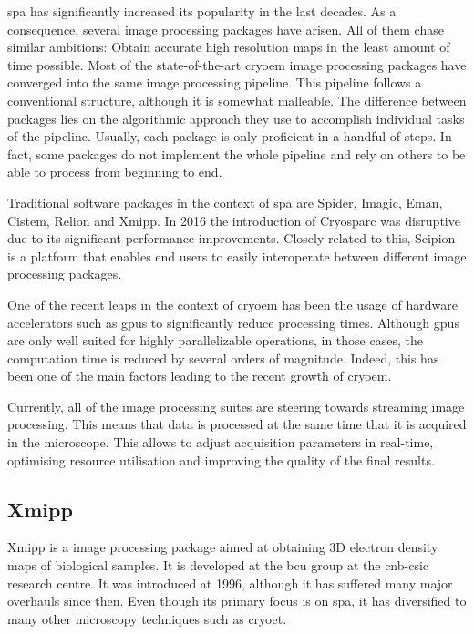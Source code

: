 \documentclass[../main.tex]{subfiles}
\begin{document}
\Gls{spa} has significantly increased its popularity in the last decades. As a consequence, several image processing packages have arisen. All of them chase similar ambitions: Obtain accurate high resolution maps in the least amount of time possible. Most of the state-of-the-art \gls{cryoem} image processing packages have converged into the same image processing pipeline. This pipeline follows a conventional structure, although it is somewhat malleable. The difference between packages lies on the algorithmic approach they use to accomplish individual tasks of the pipeline. Usually, each package is only proficient in a handful of steps. In fact, some packages do not implement the whole pipeline and rely on others to be able to process from beginning to end.

Traditional software packages in the context of \gls{spa} are Spider\cite{shaikh2008}, Imagic, Eman\cite{ludke2000}, Cistem\cite{grigorieff2018}, Relion\cite{scheres2021} and Xmipp\cite{sorzano2004}. In 2016 the introduction of Cryosparc\cite{cryosparc} was disruptive due to its significant performance improvements. Closely related to this, Scipion\cite{delarosa2016} is a platform that enables end users to easily interoperate between different image processing packages.

One of the recent leaps in the context of \gls{cryoem} has been the usage of hardware accelerators such as \glspl{gpu} to significantly reduce processing times. Although \glspl{gpu} are only well suited for highly parallelizable operations, in those cases, the computation time is reduced by several orders of magnitude. Indeed, this has been one of the main factors leading to the recent growth of \gls{cryoem}.

Currently, all of the image processing suites are steering towards streaming image processing. This means that data is processed at the same time that it is acquired in the microscope. This allows to adjust acquisition parameters in real-time, optimising resource utilisation and improving the quality of the final results.

\subsection{Xmipp}
Xmipp is a image processing package aimed at obtaining 3D electron density maps of biological samples. It is developed at the \gls{bcu} group at the \gls{cnb}-\gls{csic} research centre. It was introduced at 1996, although it has suffered many major overhauls since then. Even though its primary focus is on \gls{spa}, it has diversified to many other microscopy techniques such as \gls{cryoet}\cite{sorzano2004}.
\end{document}
